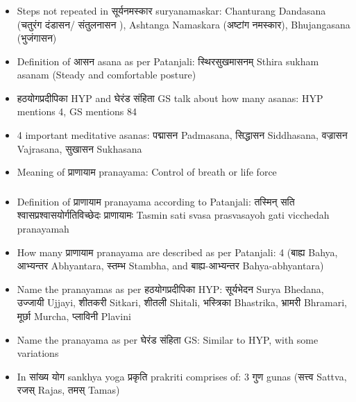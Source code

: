 \begin{frame}[fragile]\frametitle{}
\begin{itemize}
\item Steps not repeated in सूर्यनमस्कार suryanamaskar:  Chanturang Dandasana (चतुरंग दंडासन/ संतुलनासन ), Ashtanga Namaskara (अष्टांग नमस्कार), Bhujangasana (भुजंगासन)
\item Definition of आसन asana as per Patanjali: स्थिरसुखमासनम् Sthira sukham asanam (Steady and comfortable posture)
\item हठयोगप्रदीपिका HYP and घेरंड संहिता GS talk about how many asanas: HYP mentions 4, GS mentions 84
\item 4 important meditative asanas: पद्मासन Padmasana, सिद्धासन Siddhasana, वज्रासन Vajrasana, सुखासन Sukhasana
\item Meaning of प्राणायाम pranayama: Control of breath or life force
\end{itemize}
\end{frame}

\begin{frame}[fragile]\frametitle{}
\begin{itemize}
\item Definition of प्राणायाम pranayama according to Patanjali: तस्मिन् सति श्वासप्रश्वासयोर्गतिविच्छेदः प्राणायामः Tasmin sati svasa prasvasayoh gati vicchedah pranayamah
\item How many प्राणायाम pranayama are described as per Patanjali: 4 (बाह्य Bahya, आभ्यन्तर Abhyantara, स्तम्भ Stambha, and बाह्य-आभ्यन्तर Bahya-abhyantara)
\item Name the pranayamas as per हठयोगप्रदीपिका HYP: सूर्यभेदन Surya Bhedana, उज्जायी Ujjayi, शीतकरी Sitkari, शीतली Shitali, भस्त्रिका Bhastrika, भ्रामरी Bhramari, मूर्छा Murcha, प्लाविनी Plavini
\item Name the pranayama as per घेरंड संहिता GS: Similar to HYP, with some variations
\item In सांख्य योग sankhya yoga प्रकृति prakriti comprises of: 3 गुण gunas (सत्त्व Sattva, रजस् Rajas, तमस् Tamas)
\end{itemize}
\end{frame}

